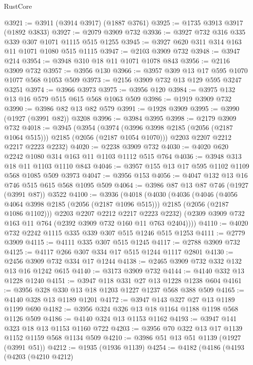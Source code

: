 \begin{lexlean}{RustCore}
\begin{coremodule}
@3921 := @3911 (@3914 @3917) (@1887 @3761)
@3925 := @1735 @3913 @3917 (@1892 @3833)
@3927 := @2079 @3909 @732
@3936 := @3927 @732 @316 @335 @339 @307 @1071 @1115 @515 @1255
@3945 := @3927 @620 @311 @314 @163 @11 @1071 @1080 @515 @1115
@3947 := @2103 @3909 @732
@3948 := @3947 @214
@3954 := @3948 @310 @18 @11 @1071 @1078 @843
@3956 := @2116 @3909 @732
@3957 := @3956 @130
@3966 := @3957 @309 @13 @17 @595 @1070 @1077 @568 @1053 @509
@3973 := @2156 @3909 @732 @13 @129 @595 @3247 @3251
@3974 := @3966 @3973
@3975 := @3956 @120
@3984 := @3975 @132 @13 @16 @579 @515 @615 @568 @1063 @509
@3986 := @1919 @3909 @732
@3990 := @3986 @82 @13 @82 @579
@3991 := @1928 @3909
@3995 := @3990 (@1927 (@3991 @82)) @3208
@3996 := @3984 @3995
@3998 := @2179 @3909 @732
@4018 := @3945
    (@3954
      (@3974 (@3996 @3998 @2185 (@2056 (@2187 @1064 @515))) @2185 (@2056 (@2187 @1054 @1070)))
      @2203
      @2207
      @2212
      @2217
      @2223
      @2232)
@4020 := @2238 @3909 @732
@4030 := @4020 @620 @2242 @1080 @314 @163 @11 @1103 @1112 @515 @764
@4036 := @3948 @313 @18 @11 @1103 @1110 @843
@4046 := @3957 @155 @13 @17 @595 @1102 @1109 @568 @1085 @509 @3973
@4047 := @3956 @153
@4056 := @4047 @132 @13 @16 @746 @515 @615 @568 @1095 @509
@4064 := @3986 @87 @13 @87 @746 (@1927 (@3991 @87)) @3522
@4100 := @3936
    (@4018
      (@4030
        (@4036
          (@4046
            (@4056 @4064 @3998 @2185 (@2056 (@2187 @1096 @515)))
            @2185
            (@2056 (@2187 @1086 @1102)))
          @2203
          @2207
          @2212
          @2217
          @2223
          @2232)
        (@2309 @3909 @732 @163 @11 @764 (@2392 @3909 @732 @160 @11 @763 @2404))))
@4110 := @4020 @732 @2242 @1115 @335 @339 @307 @515 @1246 @515 @1253
@4111 := @2779 @3909
@4115 := @4111 @335 @307 @515 @1245
@4117 := @2788 @3909 @732
@4125 := @4117 @266 @307 @334 @17 @515 @1244 @1117 @2801
@4130 := @2456 @3909 @732 @334 @17 @1244
@4138 := @2465 @3909 @732 @332 @132 @13 @16 @1242 @615
@4140 := @3173 @3909 @732
@4144 := @4140 @332 @13 @1228 @1240
@4151 := @3947 @118 @331 @27 @13 @1228 @1238 @604
@4161 := @3956 @328 @330 @13 @18 @1203 @1227 @1237 @568 @388 @509
@4165 := @4140 @328 @13 @1189 @1201
@4172 := @3947 @143 @327 @27 @13 @1189 @1199 @690
@4182 := @3956 @324 @326 @13 @18 @1164 @1188 @1198 @568 @1126 @509
@4186 := @4140 @324 @13 @1153 @1162
@4193 := @3947 @141 @323 @18 @13 @1153 @1160 @722
@4203 := @3956 @70 @322 @13 @17 @1139 @1152 @1159 @568 @1134 @509
@4210 := @3986 @51 @13 @51 @1139 (@1927 (@3991 @51))
@4212 := @1935 (@1936 @1139)
@4254 := @4182
    (@4186
      (@4193
        (@4203
          (@4210 @4212)

\end{coremodule}
\end{lexlean}
